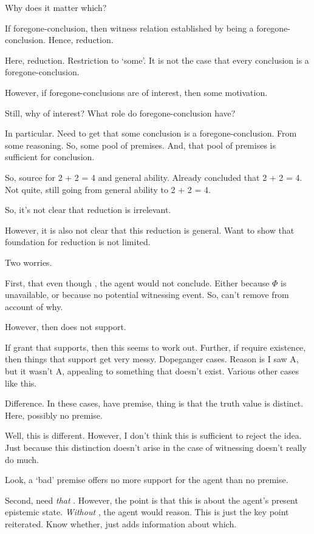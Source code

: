 \begin{note}
  Why does it matter which?

  \begin{idea}[Reduction]
    If foregone-conclusion, then witness relation established by being a foregone-conclusion.
    Hence, reduction.
  \end{idea}
  Here, reduction.
  Restriction to `some'.
  It is not the case that every conclusion is a foregone-conclusion.

  However, if foregone-conclusions are of interest, then some motivation.

  Still, why of interest?
  What role do foregone-conclusion have?

  In particular.
  Need to get that some conclusion is a foregone-conclusion.
  From some reasoning.
  So, some pool of premises.
  And, that pool of premises is sufficient for conclusion.

  So, source for 2 + 2 = 4 and general ability.
  Already concluded that 2 + 2 = 4.
  Not quite, still going from general ability to 2 + 2 = 4.

  So, it's not clear that reduction is irrelevant.

  However, it is also not clear that this reduction is general.
  Want to show that foundation for reduction is not limited.
\end{note}

\begin{note}
  Two worries.

  First, that even though , the agent would not conclude.
  Either because \(\Phi\) is unavailable, or because no potential witnessing event.
  So, can't remove  from account of why.

  However, then  does not support.

  If grant that  supports, then this seems to work out.
  Further, if require existence, then things that support get very messy.
  Dopeganger cases.
  Reason is I saw A, but it wasn't A, appealing to something that doesn't exist.
  Various other cases like this.

  Difference.
  In these cases, have premise, thing is that the truth value is distinct.
  Here, possibly no premise.

  Well, this is different.
  However, I don't think this is sufficient to reject the idea.
  Just because this distinction doesn't arise in the case of witnessing doesn't really do much.

  Look, a `bad' premise offers no more support for the agent than no premise.

  Second, need \emph{that} .
  However, the point is that this is about the agent's present epistemic state.
  \emph{Without} , the agent would reason.
  This is just the key point reiterated.
  Know whether,  just adds information about which.
\end{note}


